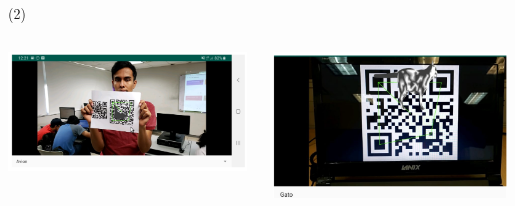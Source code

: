 
\begin{frame}{\citetitle{\EntradaBibtex} (2)}
\begin{columns}
\begin{column}{0.5\textwidth}
    \begin{center}
\includegraphics[width=0.98\textwidth]{Figs/SistemaAR2}\\
     \end{center}

\end{column}
\begin{column}{0.5\textwidth}  
    \begin{center}
\begin{itemize}
\end{itemize}

\includegraphics[width=0.98\textwidth]{Figs/SistemaAR3}\\
     \end{center}
\end{column}
\end{columns}



\end{frame}

